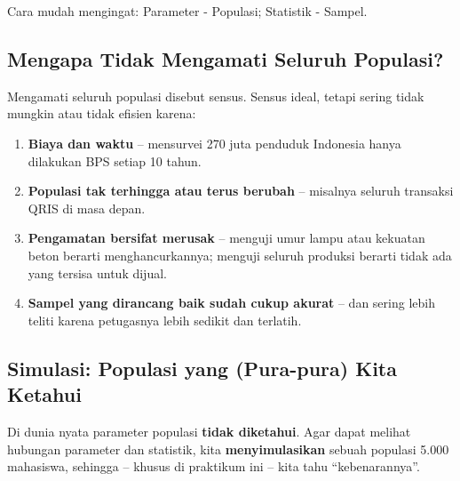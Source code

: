 \documentclass[
  indonesian,
  letterpaper,
]{book}
\providecommand{\tightlist}{%
  \setlength{\itemsep}{0pt}\setlength{\parskip}{0pt}}
\begin{document}
Cara mudah mengingat: Parameter - Populasi; Statistik - Sampel.

\subsection{Mengapa Tidak Mengamati Seluruh
Populasi?}\label{mengapa-tidak-mengamati-seluruh-populasi}

Mengamati seluruh populasi disebut sensus. Sensus ideal, tetapi sering
tidak mungkin atau tidak efisien karena:

\begin{enumerate}
\def\labelenumi{\arabic{enumi}.}
\tightlist
\item
  \textbf{Biaya dan waktu} -- mensurvei 270 juta penduduk Indonesia
  hanya dilakukan BPS setiap 10 tahun.
\item
  \textbf{Populasi tak terhingga atau terus berubah} -- misalnya seluruh
  transaksi QRIS di masa depan.
\item
  \textbf{Pengamatan bersifat merusak} -- menguji umur lampu atau
  kekuatan beton berarti menghancurkannya; menguji seluruh produksi
  berarti tidak ada yang tersisa untuk dijual.
\item
  \textbf{Sampel yang dirancang baik sudah cukup akurat} -- dan sering
  lebih teliti karena petugasnya lebih sedikit dan terlatih.
\end{enumerate}

\subsection{Simulasi: Populasi yang (Pura-pura) Kita
Ketahui}\label{simulasi-populasi-yang-pura-pura-kita-ketahui}

Di dunia nyata parameter populasi \textbf{tidak diketahui}. Agar dapat
melihat hubungan parameter dan statistik, kita \textbf{menyimulasikan}
sebuah populasi 5.000 mahasiswa, sehingga -- khusus di praktikum ini --
kita tahu ``kebenarannya''.
\end{document}
